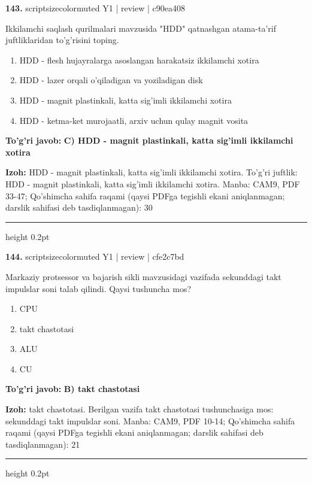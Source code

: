 \documentclass[10pt,a4paper]{article}
\begin{document}
{\bfseries\sffamily\color{ink} 143.} {scriptsizecolor{muted} Y1 | review | c90ea408}
\par
Ikkilamchi saqlash qurilmalari mavzusida "HDD" qatnashgan atama-ta'rif juftliklaridan to'g'risini toping.
\begin{enumerate}[label=\Alph*),leftmargin=9mm]
\item HDD - flesh hujayralarga asoslangan harakatsiz ikkilamchi xotira
\item HDD - lazer orqali o'qiladigan va yoziladigan disk
\item HDD - magnit plastinkali, katta sig'imli ikkilamchi xotira
\item HDD - ketma-ket murojaatli, arxiv uchun qulay magnit vosita
\end{enumerate}
\begin{tcolorbox}[enhanced,breakable,colback=teal!4,colframe=teal!60!black,boxrule=0.45pt,arc=1.2mm,left=2.7mm,right=2.7mm,top=1.8mm,bottom=1.8mm,before skip=2mm,after skip=2mm]
{\bfseries\sffamily\color{teal}To'g'ri javob:} \textbf{C) HDD - magnit plastinkali, katta sig'imli ikkilamchi xotira}
\par\smallskip
{\bfseries Izoh:} HDD - magnit plastinkali, katta sig'imli ikkilamchi xotira. To'g'ri juftlik: HDD - magnit plastinkali, katta sig'imli ikkilamchi xotira. Manba: CAM9, PDF 33-47; Qo'shimcha sahifa raqami (qaysi PDFga tegishli ekani aniqlanmagan; darslik sahifasi deb tasdiqlanmagan): 30
\end{tcolorbox}
\vspace{2mm}\hrule height 0.2pt\vspace{3mm}

{\bfseries\sffamily\color{ink} 144.} {scriptsizecolor{muted} Y1 | review | cfe2c7bd}
\par
Markaziy protsessor va bajarish sikli mavzusidagi vazifada sekunddagi takt impulslar soni talab qilindi. Qaysi tushuncha mos?
\begin{enumerate}[label=\Alph*),leftmargin=9mm]
\item CPU
\item takt chastotasi
\item ALU
\item CU
\end{enumerate}
\begin{tcolorbox}[enhanced,breakable,colback=teal!4,colframe=teal!60!black,boxrule=0.45pt,arc=1.2mm,left=2.7mm,right=2.7mm,top=1.8mm,bottom=1.8mm,before skip=2mm,after skip=2mm]
{\bfseries\sffamily\color{teal}To'g'ri javob:} \textbf{B) takt chastotasi}
\par\smallskip
{\bfseries Izoh:} takt chastotasi. Berilgan vazifa takt chastotasi tushunchasiga mos: sekunddagi takt impulslar soni. Manba: CAM9, PDF 10-14; Qo'shimcha sahifa raqami (qaysi PDFga tegishli ekani aniqlanmagan; darslik sahifasi deb tasdiqlanmagan): 21
\end{tcolorbox}
\vspace{2mm}\hrule height 0.2pt\vspace{3mm}
\end{document}
